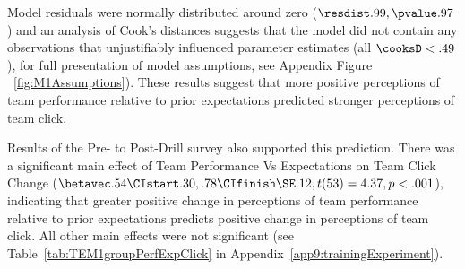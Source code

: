 \begin{CJK}{UTF8}{gbsn}
Model residuals were normally distributed around zero ($\resdist .99, \pvalue .97$) and an analysis of Cook's distances suggests that the model did not contain any observations that unjustifiably influenced parameter estimates (all $\cooksD < .49$), for full presentation of model assumptions, see Appendix Figure ~\ref{fig:M1Assumptions}).  These results suggest that more positive perceptions of team performance relative to prior expectations predicted stronger perceptions of team click.


Results of the Pre- to Post-Drill survey also supported this prediction.  There was a significant main effect of Team Performance Vs Expectations on Team Click Change ($\betavec .54 \CIstart .30, .78 \CIfinish \SE .12, t(53) = 4.37, p < .001$), indicating that greater positive change in perceptions of team performance relative to prior expectations predicts positive change in perceptions of team click.  All other main effects were not significant (see Table~\ref{tab:TEM1groupPerfExpClick} in Appendix~\ref{app9:trainingExperiment}).





\end{CJK}
